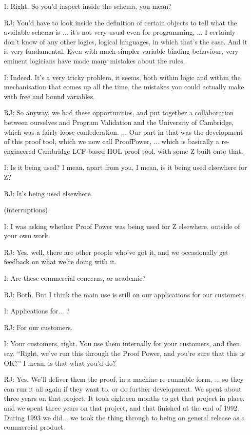 \documentclass[10pt,titlepage]{book}
\begin{document}
I: Right.
So you'd inspect inside the schema, you mean?

RJ: You'd have to look inside the definition of certain objects to tell what the available schema is ... it's not very usual even for programming, ... I certainly don't know of any other logics, logical languages, in which that's the case.
And it is very fundamental.
Even with much simpler variable-binding behaviour, very eminent logicians have made many mistakes about the rules.

I: Indeed.
It's a very tricky problem, it seems, both within logic and within the mechanisation that comes up all the time, the mistakes you could actually make with free and bound variables.

RJ: So anyway, we had these opportunities, and put together a collaboration between ourselves and Program Validation and the University of Cambridge, which was a fairly loose confederation.
...
Our part in that was the development of this proof tool, which we now call ProofPower, ... which is basically a re-engineered Cambridge LCF-based HOL proof tool, with some Z built onto that.

I: Is it being used?
I mean, apart from you, I mean, is it being used elsewhere for Z?

RJ: It's being used elsewhere.

(interruptions)

I: I was asking whether Proof Power was being used for Z elsewhere, outside of your own work.

RJ: Yes, well, there are other people who've got it, and we occasionally get feedback on what we're doing with it.

I: Are these commercial concerns, or academic?

RJ: Both.
But I think the main use is still on our applications for our customers.

I: Applications for... ?

RJ: For our customers.

I: Your customers, right.
You use them internally for your customers, and then say, ``Right, we've run this through the Proof Power, and you're sure that this is OK?'' I mean, is that what you'd do?

RJ: Yes.
We'll deliver them the proof, in a machine re-runnable form, ... so they can run it all again if they want to, or do further development.
We spent about three years on that project.
It took eighteen months to get that project in place, and we spent three years on that project, and that finished at the end of 1992.
During 1993 we did... we took the thing through to being on general release as a commercial product.
\end{document}
